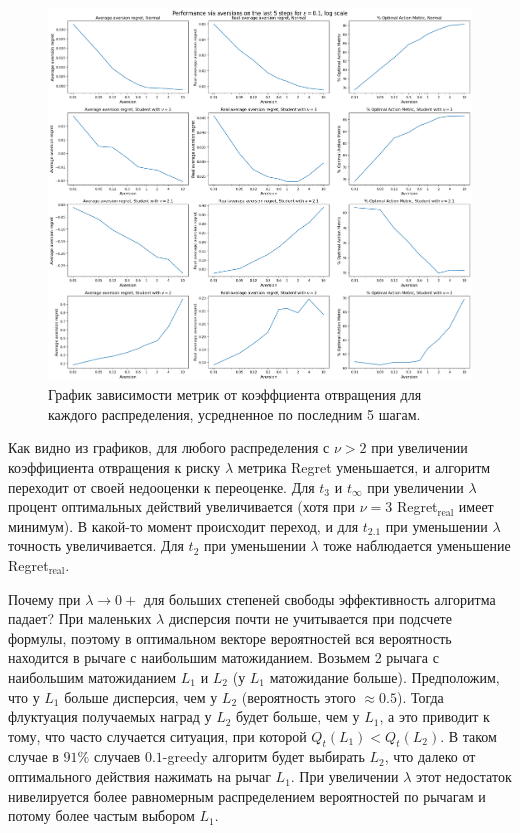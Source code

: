 \begin{figure}[ht!] %
\centering
\includegraphics[width=6in]{theory_tester/theory_images/epsilon_greedy/aversion_last_5_steps.png}
\caption{График зависимости метрик от коэффциента отвращения для каждого распределения, усредненное по последним 5 шагам.}
\label{fig:aversion_last_5_steps}
\end{figure}

Как видно из графиков, для любого распределения с $\nu > 2$ при увеличении коэффициента отвращения к риску $\lambda$ метрика Regret уменьшается, и алгоритм переходит от своей недооценки к переоценке. Для $t_3$ и $t_{\infty}$ при увеличении $\lambda$ процент оптимальных действий увеличивается (хотя при $\nu = 3$ Regret$_{{\text{real}}}$ имеет минимум). В какой-то момент происходит переход, и для $t_{2.1}$ при уменьшении $\lambda$ точность увеличивается. Для $t_2$ при уменьшении $\lambda$ тоже наблюдается уменьшение Regret$_{{\text{real}}}$.

Почему при $\lambda \to 0+$ для больших степеней свободы эффективность алгоритма падает? При маленьких $\lambda$ дисперсия почти не учитывается при подсчете формулы, поэтому в оптимальном векторе вероятностей вся вероятность находится в рычаге с наибольшим матожиданием. Возьмем 2 рычага с наибольшим матожиданием $L_1$ и $L_2$ (у $L_1$ матожидание больше). Предположим, что у $L_1$ больше дисперсия, чем у $L_2$ (вероятность этого $\approx 0.5$). Тогда флуктуация получаемых наград у $L_2$ будет больше, чем у $L_1$, а это приводит к тому, что часто случается ситуация, при которой $Q_t(L_1) < Q_t(L_2)$. В таком случае в $91\%$ случаев $0.1$-greedy алгоритм будет выбирать $L_2$, что далеко от оптимального действия нажимать на рычаг $L_1$. При увеличении $\lambda$ этот недостаток нивелируется более равномерным распределением вероятностей по рычагам и потому более частым выбором $L_1$.


